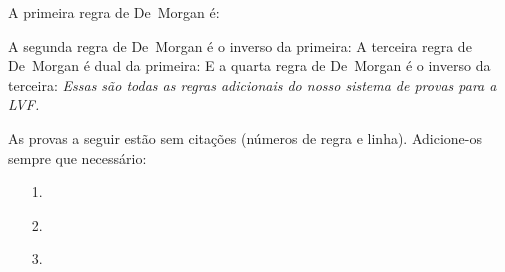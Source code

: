  A primeira regra de De~Morgan é:
 
A segunda regra de De~Morgan é o inverso da primeira:
A terceira regra de De~Morgan é dual da primeira:
E a quarta regra de De~Morgan é o inverso da terceira:
\emph{Essas são todas as regras adicionais do nosso sistema de provas para a  LVF.}

\practiceproblems
\solutions
\problempart
\label{pr.justifyTFLproof}
As provas a seguir estão sem citações (números de regra e linha). Adicione-os sempre que necessário:

\begin{itemize}
\item[1.] 
	\begin{fitchproof}
 {}
 {}
\end{fitchproof}

\item[]

\item[2.]
\begin{fitchproof}
\open
\close
{}
\end{fitchproof}

\item[]

\item[3.]
\begin{fitchproof}
\open
	 {}
		\open
	\close
\close
{}
\end{fitchproof}
\end{itemize}

